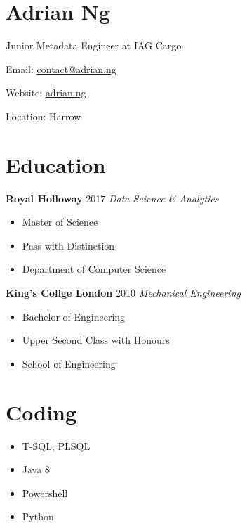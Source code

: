 \documentclass[../cv.tex]{subfiles}
\begin{document}
\section{Adrian Ng}
Junior Metadata Engineer at IAG Cargo
\hfill
\begin{description*}
	\item[Email:] \href{mailto:contact@adrian.ng}{contact@adrian.ng}
	\item[Website:] \href{https://adrian.ng}{adrian.ng}
	\item[Location:] Harrow
\end{description*}
\hfill
\vspace{0.25cm}
\noindent
\newline
\begin{minipage}[t]{0.6\linewidth}
	\section{Education}
	\begin{minipage}[t]{0.5\linewidth}
		\textbf{Royal Holloway} \hfill 2017
		\newline
		\textit{Data Science \& Analytics}
		\begin{itemize}[leftmargin=*, itemsep=0.1em]
			\item	Master of Science
			\item	Pass with Distinction
			\item 	Department of Computer Science
		\end{itemize}
	\end{minipage}
	\hspace{0.2em}
	\begin{minipage}[t]{0.5\linewidth}
		\textbf{King's Collge London} \hfill 2010
		\newline
		\textit{Mechanical Engineering}
		\begin{itemize}[leftmargin=*, itemsep=0.1em]
			\item Bachelor of Engineering
			\item Upper Second Class with Honours
			\item School of Engineering
		\end{itemize}
	\end{minipage}
\end{minipage}
\hspace{0.2cm}
\begin{minipage}[t]{0.15\linewidth}
	\section{Coding}
	\begin{itemize}[leftmargin=*]
		\item T-SQL, PLSQL		
		\item Java 8		
		\item Powershell	
		\item Python
	\end{itemize}
\end{minipage}
\end{document}
